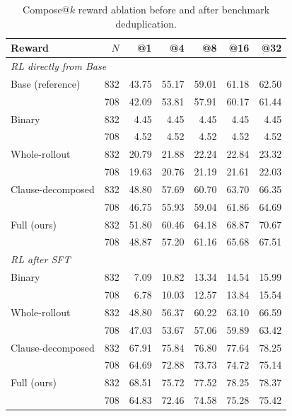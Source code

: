 \documentclass[10pt]{article}
\begin{document}
\begin{table}[H]
\centering
\begin{tabular}{lrrrrrr}
\toprule
\rowcolor{headerbg}
Reward & \(N\) & @1 & @4 & @8 & @16 & @32 \\
\midrule
\multicolumn{7}{l}{\textit{RL directly from Base}} \\
Base (reference)  & 832 & 43.75 & 55.17 & 59.01 & 61.18 & 62.50 \\
                  & 708 & 42.09 & 53.81 & 57.91 & 60.17 & 61.44 \\
\addlinespace
Binary            & 832 & 4.45 & 4.45 & 4.45 & 4.45 & 4.45 \\
                  & 708 & 4.52 & 4.52 & 4.52 & 4.52 & 4.52 \\
\addlinespace
Whole-rollout     & 832 & 20.79 & 21.88 & 22.24 & 22.84 & 23.32 \\
                  & 708 & 19.63 & 20.76 & 21.19 & 21.61 & 22.03 \\
\addlinespace
Clause-decomposed & 832 & 48.80 & 57.69 & 60.70 & 63.70 & 66.35 \\
                  & 708 & 46.75 & 55.93 & 59.04 & 61.86 & 64.69 \\
\addlinespace
Full (ours)       & 832 & 51.80 & 60.46 & 64.18 & 68.87 & 70.67 \\
                  & 708 & 48.87 & 57.20 & 61.16 & 65.68 & 67.51 \\
\midrule
\multicolumn{7}{l}{\textit{RL after SFT}} \\
Binary            & 832 & 7.09 & 10.82 & 13.34 & 14.54 & 15.99 \\
                  & 708 & 6.78 & 10.03 & 12.57 & 13.84 & 15.54 \\
\addlinespace
Whole-rollout     & 832 & 48.80 & 56.37 & 60.22 & 63.10 & 66.59 \\
                  & 708 & 47.03 & 53.67 & 57.06 & 59.89 & 63.42 \\
\addlinespace
Clause-decomposed & 832 & 67.91 & 75.84 & 76.80 & 77.64 & 78.25 \\
                  & 708 & 64.69 & 72.88 & 73.73 & 74.72 & 75.14 \\
\addlinespace
Full (ours)       & 832 & 68.51 & 75.72 & 77.52 & 78.25 & 78.37 \\
                  & 708 & 64.83 & 72.46 & 74.58 & 75.28 & 75.42 \\
\bottomrule
\end{tabular}
\caption{Compose@\(k\) reward ablation before and after benchmark deduplication.}
\label{tab:supp-reward-compose}
\end{table}
\end{document}
